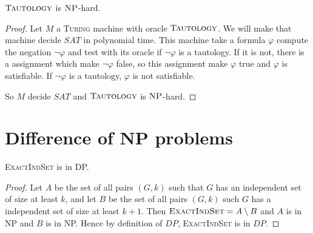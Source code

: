 \begin{propo}
    $\textsc{Tautology}$ is $\textsc{NP}$-hard.
\end{propo}
\begin{proof}
    Let $M$ a \textsc{Turing} machine with oracle $\textsc{Tautology}$. We will make that machine decide $SAT$ in polynomial time.
    This machine take a formula $\varphi$ compute the negation $\neg\varphi$ and test with its oracle if $\neg\varphi$ is a tautology. If it is not, there is a assignment which make $\neg\varphi$ false, so this assignment make $\varphi$ true and $\varphi$ is satisfiable. If $\neg\varphi$ is a tautology, $\varphi$ is not satisfiable.

    So $M$ decide $SAT$ and $\textsc{Tautology}$ is $\textsc{NP}$-hard.
\end{proof}

\section{Difference of NP problems}

\begin{propo}\label{3:1}
    \textsc{ExactIndSet} is in DP.
\end{propo}
\begin{proof}
    Let $A$ be the set of all pairs $(G, k)$ such that $G$ has an independent set of size at least $k$, and let $B$ be the set of all pairs $(G, k)$ such $G$ has a independent set of size at least $k+1$. Then $\textsc{ExactIndSet}=A \setminus B$ and $A$ is in NP and $B$ is in NP. Hence by definition of $DP$, \textsc{ExactIndSet} is in $DP$.
\end{proof}

